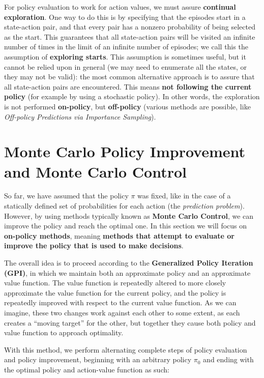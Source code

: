 For policy evaluation to work for action values, we must assure \textbf{continual exploration}. One way to do this is by specifying that the episodes start in a state-action pair, and that every pair has a nonzero probability of being selected as the start. This guarantees that all state-action pairs will be visited an infinite number of times in the limit of an infinite number of episodes; we call this the assumption of \textbf{exploring starts}. This assumption is sometimes useful, but it cannot be relied upon in general (we may need to enumerate all the states, or they may not be valid): the most common alternative approach is to assure that all state-action pairs are encountered. This means \textbf{not following the current policy} (for example by using a stochastic policy). In other words, the exploration is not performed \textbf{on-policy}, but \textbf{off-policy} (various methods are possible, like \textit{Off-policy Predictions via Importance Sampling}).

\section{Monte Carlo Policy Improvement and Monte Carlo Control}
So far, we have assumed that the policy $\pi$ was fixed, like in the case of a statically defined set of probabilities for each action (the \textit{prediction problem}). However, by using methods typically known as \textbf{Monte Carlo Control}, we can improve the policy and reach the optimal one. In this section we will focus on \textbf{on-policy methods}, meaning \textbf{methods that attempt to evaluate or improve the policy that is used to make decisions}.

The overall idea is to proceed according to the \textbf{Generalized Policy Iteration (GPI)}, in which we maintain both an approximate policy and an approximate value function. The value function is repeatedly altered to more closely approximate the value function for the current policy, and the policy is repeatedly improved with respect to the current value function. As we can imagine, these two changes work against each other to some extent, as each creates a ``moving target'' for the other, but together they cause both policy and value function to approach optimality.

With this method, we perform alternating complete steps of policy evaluation and policy improvement, beginning with an arbitrary policy $\pi_0$ and ending with the optimal policy and action-value function as such:

